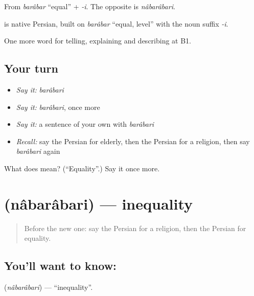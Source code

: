 From \emph{barâbar} \textquotedblleft{}equal\textquotedblright{} + \emph{-i}. The opposite is \emph{nâbarâbari}.

\begin{cousinweb}
\textbf{} is native Persian, built on \emph{barâbar} \textquotedblleft{}equal, level\textquotedblright{} with the noun suffix \emph{-i}.
\end{cousinweb}

\begin{grammarlens}[title={What you've built}]
One more word for telling, explaining and describing at B1.
\end{grammarlens}

\subsection*{Your turn}
\begin{itemize}
\raggedright
  \item \emph{Say it:} \emph{barâbari}
  \item \emph{Say it:} \emph{barâbari}, once more
  \item \emph{Say it:} a sentence of your own with \emph{barâbari}
  \item \emph{Recall:} say the Persian for elderly, then the Persian for a religion, then say \emph{barâbari} again
\end{itemize}

\begin{tcolorbox}[breakable,colback=teal!4,colframe=teal!35!black,title={Before you move on}]
What does  mean? (\textquotedblleft{}Equality\textquotedblright{}.) Say it once more.
\end{tcolorbox}
\section[\texorpdfstring{\fa{نابرابری} (nâbarâbari)}{نابرابری (nâbarâbari)}]{ (nâbarâbari) — inequality}

\label{lesson:FA-C386-nabarabari}



\begin{quote}
Before the new one: say the Persian for a religion, then the Persian for equality.
\end{quote}

\subsection*{You'll want to know: }
\textbf{} (\emph{nâbarâbari}) — \textquotedblleft{}inequality\textquotedblright{}.


